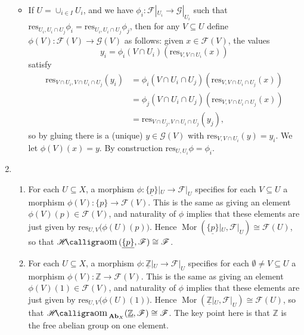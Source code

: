 \documentclass{report}
\newcommand{\cat}[1]{\mathbf{#1}} %
\newcommand{\shConst}[1]{\underline{#1}} %
\newcommand{\res}{{\mathrm{res}}} %
\newcommand{\scrF}{\mathscr{F}}
\newcommand{\scrG}{\mathscr{G}}
\newcommand{\Z}{\mathbb{Z}}
\DeclareMathOperator{\Mor}{Mor}
\DeclareMathOperator{\shHom}{\mathscr{H}\text{\kern -3pt {\calligra\large om}}\,}
\begin{document}
\begin{enumerate}[label=\textbf{2.3.\Alph*.}]
\begin{itemize}
		      \item If $U=\cup_{i\in I}U_i$, and we have
		            $\phi_i:\scrF|_{U_i}\to\scrG|_{U_i}$ such that
		            $\res_{U_i,U_i\cap U_j}\phi_i=\res_{U_i,U_i\cap U_j}\phi_j$,
		            then for any $V\subseteq U$ define $\phi(V):\scrF(V)\to\scrG(V)$ as
		            follows: given $x\in\scrF(V)$, the values
		            \begin{equation*}
			            y_i=\phi_i(V\cap U_i)(\res_{V,V\cap U_i}(x))
		            \end{equation*}
		            satisfy
		            \begin{align*}
			            \res_{V\cap U_i,V\cap U_i\cap U_j}(y_i)
			             & = \phi_i(V\cap U_i\cap U_j)(\res_{V,V\cap U_i\cap U_j}(x)) \\
			             & = \phi_j(V\cap U_i\cap U_j)(\res_{V,V\cap U_i\cap U_j}(x)) \\
			             & = \res_{V\cap U_j,V\cap U_i\cap U_j}(y_j),
		            \end{align*}
		            so by gluing there is a (unique) $y\in\scrG(V)$ with
		            $\res_{V,V\cap U_i}(y)=y_i$. We let $\phi(V)(x)=y$. By
		            construction $\res_{U,U_i}\phi=\phi_i$.
	      \end{itemize}

	\item
	      \begin{enumerate}[label=(\alph*)]
		      \item For each $U\subseteq X$, a morphism
		            $\phi:\shConst{\{p\}}|_U\to\scrF|_U$ specifies for each
		            $V\subseteq U$ a morphism $\phi(V):\{p\}\to\scrF(V)$. This is the
		            same as giving an element $\phi(V)(p)\in\scrF(V)$, and naturality
		            of $\phi$ implies that these elements are just given by
		            $\res_{U,V}\bigl(\phi(U)(p)\bigr)$. Hence
		            $\Mor(\shConst{\{p\}}|_U,\scrF|_U)\cong\scrF(U)$, so that
		            $\shHom(\shConst{\{p\}},\scrF)\cong\scrF$.

		      \item For each $U\subseteq X$, a morphism
		            $\phi:\shConst\Z|_U\to\scrF|_U$ specifies for each
		            $\emptyset\ne V\subseteq U$ a morphism $\phi(V):\Z\to\scrF(V)$.
		            This is the same as giving an element $\phi(V)(1)\in\scrF(V)$, and
		            naturality of $\phi$ implies that these elements are just given
		            by $\res_{U,V}\bigl(\phi(U)(1)\bigr)$. Hence
		            $\Mor(\shConst\Z|_U,\scrF|_U)\cong\scrF(U)$, so that
		            $\shHom_{\cat{Ab}_X}(\shConst\Z,\scrF)\cong\scrF$. The key point here
		            is that $\Z$ is the free abelian group on one element.


\end{enumerate}
\end{enumerate}
\end{document}
